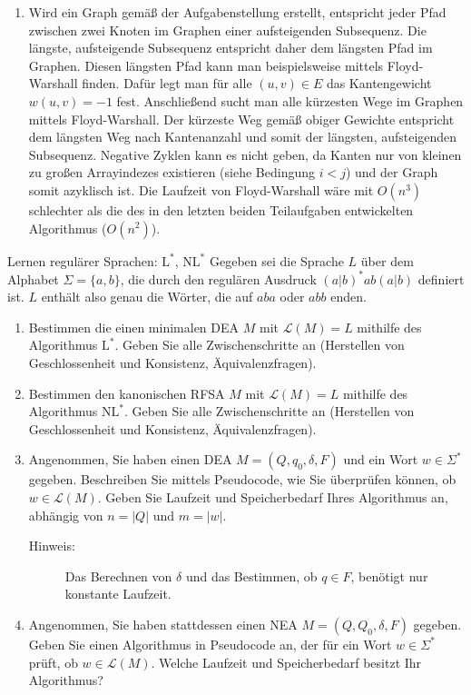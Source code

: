 \documentclass[11pt,a4paper]{article}
\begin{document}
\begin{loesung}
\begin{enumerate}
        \item Wird ein Graph gemäß der Aufgabenstellung erstellt, entspricht jeder Pfad zwischen zwei Knoten im Graphen einer aufsteigenden Subsequenz.
        Die längste, aufsteigende Subsequenz entspricht daher dem längsten Pfad im Graphen.
        Diesen längsten Pfad kann man beispielsweise mittels Floyd-Warshall finden.
        Dafür legt man für alle $(u, v) \in E$ das Kantengewicht $w(u, v) = -1$ fest.
        Anschließend sucht man alle kürzesten Wege im Graphen mittels Floyd-Warshall. Der kürzeste Weg gemäß obiger Gewichte entspricht dem längsten Weg nach Kantenanzahl und somit der längsten, aufsteigenden Subsequenz.
        Negative Zyklen kann es nicht geben, da Kanten nur von kleinen zu großen Arrayindezes existieren (siehe Bedingung $i < j$) und der Graph somit azyklisch ist.
        Die Laufzeit von Floyd-Warshall wäre mit $O(n^3)$ schlechter als die des in den letzten beiden Teilaufgaben entwickelten Algorithmus ($O(n^2)$).
    \end{enumerate}
\end{loesung}

\begin{aufgabe}{4}{Lernen regulärer Sprachen: $\mathrm{L}^*$, $\mathrm{NL}^*$}
    Gegeben sei die Sprache $L$ über dem Alphabet $\Sigma = \{a, b\}$, die durch den regulären Ausdruck $(a|b)^*ab(a|b)$ definiert ist. $L$ enthält also genau die Wörter, die auf $aba$ oder $abb$ enden.
    \begin{enumerate}
        \item Bestimmen die einen minimalen DEA $M$ mit $\mathcal{L}(M) = L$ mithilfe des Algorithmus $\mathrm{L}^*$. Geben Sie alle Zwischenschritte an (Herstellen von Geschlossenheit und Konsistenz, Äquivalenzfragen).
        \item Bestimmen den kanonischen RFSA $M$ mit $\mathcal{L}(M) = L$ mithilfe des Algorithmus $\mathrm{NL}^*$. Geben Sie alle Zwischenschritte an (Herstellen von Geschlossenheit und Konsistenz, Äquivalenzfragen).
        \item Angenommen, Sie haben einen DEA $M = (Q, q_0, \delta, F)$ und ein Wort $w \in \Sigma^*$ gegeben.
        Beschreiben Sie mittels Pseudocode, wie Sie überprüfen können, ob $w \in \mathcal{L}(M)$. Geben Sie Laufzeit und Speicherbedarf Ihres Algorithmus an, abhängig von $n = |Q|$ und $m = |w|$.
        \begin{description}
            \item[Hinweis:] Das Berechnen von $\delta$ und das Bestimmen, ob $q \in F$, benötigt nur konstante Laufzeit.
        \end{description}
        \item Angenommen, Sie haben stattdessen einen NEA $M = (Q, Q_0, \delta, F)$ gegeben.
        Geben Sie einen Algorithmus in Pseudocode an, der für ein Wort $w \in \Sigma^*$ prüft, ob $w \in \mathcal{L}(M)$.
        Welche Laufzeit und Speicherbedarf besitzt Ihr Algorithmus?
    \end{enumerate}
\end{aufgabe}
\end{document}
